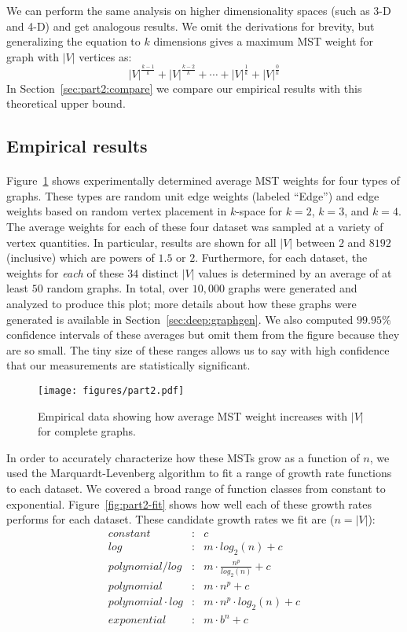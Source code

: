 We can perform the same analysis on higher dimensionality spaces (such as 3-D
and 4-D) and get analogous results. We omit the derivations for brevity, but
generalizing the equation to $k$ dimensions gives a maximum MST weight for graph
with $|V|$ vertices as:
\[ |V|^{\frac{k-1}{k}} + |V|^{\frac{k-2}{k}} + \cdots + |V|^{\frac{1}{k}} +
|V|^{\frac{0}{k}} \]
In Section~\ref{sec:part2:compare} we compare our empirical results with this
theoretical upper bound.

\subsection{Empirical results}
\paragraph{}
Figure~\ref{fig:part2} shows experimentally determined average MST weights for
four types of graphs.  These types are random unit edge weights (labeled
``Edge'') and edge weights based on random vertex placement in $k$-space for
$k=2$, $k=3$, and $k=4$.  The average weights for each of these four dataset was
sampled at a variety of vertex quantities.  In particular, results are shown for
all $|V|$ between $2$ and $8192$ (inclusive) which are powers of $1.5$ or $2$.
Furthermore, for each dataset, the weights for \textit{each} of these $34$
distinct $|V|$ values is determined by an average of at least $50$ random
graphs.  In total, over $10,000$ graphs were generated and analyzed to produce
this plot; more details about how these graphs were generated is available in
Section~\ref{sec:deep:graphgen}. We also computed $99.95\%$ confidence intervals
of these averages but omit them from the figure because they are so small.  The
tiny size of these ranges allows us to say with high confidence that our
measurements are statistically significant.

\begin{figure}[t!]
\centering
\texttt{[image: figures/part2.pdf]}
\caption{Empirical data showing how average MST weight increases with $|V|$
  for complete graphs.}
\label{fig:part2}
\end{figure}

In order to accurately characterize how these MSTs grow as a function of $n$, we
used the Marquardt-Levenberg algorithm to fit a range of growth rate functions
to each dataset.  We covered a broad range of function classes from constant to
exponential.  Figure~\ref{fig:part2-fit} shows how well each of these growth
rates performs for each dataset.  These candidate growth rates we fit are ($n =
|V|$):
\begin{eqnarray*}
constant&:& c \\
log&:& m \cdot log_2(n) + c \\
polynomial / log&:& m \cdot \frac{n^p}{log_2(n)} + c \\
polynomial&:& m \cdot n^p + c \\
polynomial \cdot log&:& m \cdot n^p \cdot log_2(n) + c \\
exponential&:& m \cdot b^n + c
\end{eqnarray*}

